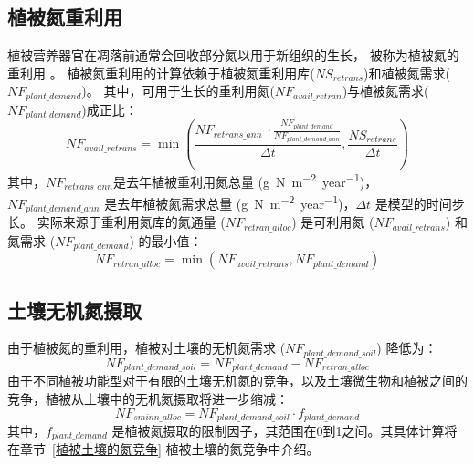 \subsection{植被氮重利用}\label{植被氮重利用}
植被营养器官在凋落前通常会回收部分氮以用于新组织的生长，
被称为植被氮的重利用 \citep{magill1997biogeochemical,oikawa2005dynamics,son1991aboveground}。
植被氮重利用的计算依赖于植被氮重利用库($NS_{retrans}$)和植被氮需求($NF_{plant\_{demand}}$)。
其中，可用于生长的重利用氮($NF_{avail\_{retran}}$)与植被氮需求($NF_{plant\_{demand}}$)成正比：
\begin{equation}
NF_{avail\_retrans}=\min{\left(\frac{NF_{retrans\_ann}\ \cdot \frac{NF_{plant\_demand}}{NF_{plant\_demand\_ann}}}{{\Delta t}}, \frac{NS_{retrans}}{{\Delta t}}\right)}
\end{equation}
其中，$NF_{retrans\_ann}$是去年植被重利用氮总量 (\unit{g.N.m^{-2}.year^{-1}})，$NF_{plant\_demand\_ann}$ 是去年植被氮需求总量 (\unit{g.N.m^{-2}.year^{-1}})，${\Delta t}$ 是模型的时间步长。
实际来源于重利用氮库的氮通量 ($NF_{retran\_alloc}$) 是可利用氮 ($NF_{avail\_retrans}$) 和氮需求 ($NF_{plant\_demand}$) 的最小值：
\begin{equation}\label{NF_retran_alloc}
  NF_{retran\_alloc}=\min{\left(NF_{avail\_retrans}, NF_{plant\_demand}\right)}
\end{equation}


\subsection{土壤无机氮摄取}\label{土壤无机氮摄取}
由于植被氮的重利用，植被对土壤的无机氮需求 ($NF_{plant\_demand\_soil}$) 降低为：
\begin{equation}\label{NF_plant_demand_soil}
  NF_{plant\_demand\_soil} = NF_{plant\_demand} - NF_{retran\_alloc}	       
\end{equation}
由于不同植被功能型对于有限的土壤无机氮的竞争，以及土壤微生物和植被之间的竞争，植被从土壤中的无机氮摄取将进一步缩减：
\begin{equation}\label{NF_sminn_alloc}
NF_{sminn\_alloc} = NF_{plant\_demand\_soil}\cdot f_{plant\_demand}
\end{equation}
其中，$f_{plant\_demand}$ 是植被氮摄取的限制因子，其范围在0到1之间。其具体计算将在章节~\ref{植被土壤的氮竞争} 植被土壤的氮竞争中介绍。


